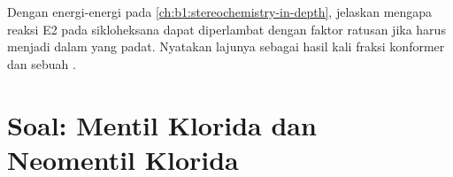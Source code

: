 \begin{exercise}[$\star\star\star$]\label{exo:b1:elimination:12}
Dengan energi-energi pada \cref{ch:b1:stereochemistry-in-depth}, jelaskan
mengapa reaksi E2 pada sikloheksana dapat diperlambat dengan faktor
ratusan jika  harus menjadi  dalam  yang padat.
Nyatakan lajunya sebagai hasil kali fraksi konformer dan sebuah .
\end{exercise}

\section{Soal: Mentil Klorida dan Neomentil Klorida}

